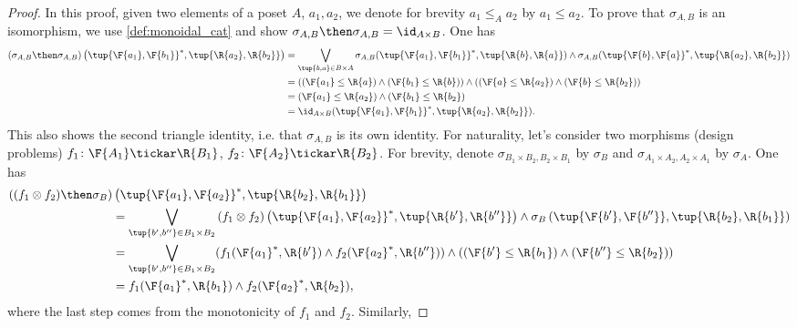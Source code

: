 \begin{proof}
In this proof, given two elements of a poset $A$, $a_1,a_2$, we denote for brevity $a_1 \leq_A a_2$ by $a_1 \leq a_2$.
To prove that $\sigma_{A,B}$ is an isomorphism, we use \cref{def:monoidal_cat} and show $\sigma_{A,B}\then \sigma_{A,B}=\id_{A\times B}$. One has
    \begin{equation}
        \begin{aligned}
           \left( \sigma_{A,B}\then \sigma_{A,B}\right) \left( \tup{\F{a_1},\F{b_1}}^*,\tup{\R{a_2},\R{b_2}}\right)&=\bigvee_{\tup{b,a}\in B\times A}\sigma_{A,B}(\tup{\F{a_1},\F{b_1}}^*,\tup{\R{b},\R{a}})\wedge \sigma_{A,B}(\tup{\F{b},\F{a}}^*,\tup{\R{a_2},\R{b_2}})\\
           &=\left( (\F{a_1}\leq \R{a}) \wedge (\F{b_1}\leq \R{b})\right)\wedge \left((\F{a}\leq \R{a_2}) \wedge (\F{b}\leq \R{b_2})\right)\\
           &=(\F{a_1}\leq \R{a_2})\wedge (\F{b_1}\leq \R{b_2})\\
           &=\id_{A\times B}(\tup{\F{a_1},\F{b_1}}^*,\tup{\R{a_2},\R{b_2}}).
        \end{aligned}
    \end{equation}
    This also shows the second triangle identity, i.e. that $\sigma_{A,B}$ is its own identity.
    For naturality, let's consider two morphisms (design problems) $f_1\colon \F{A_1}\tickar \R{B_1}$, $f_2\colon \F{A_2}\tickar \R{B_2}$. For brevity, denote $\sigma_{B_1\times B_2,B_2\times B_1}$ by $\sigma_B$ and $\sigma_{A_1\times A_2,A_2\times A_1}$ by $\sigma_A$. One has
    \begin{equation}
        \begin{aligned}
           \left((f_1\otimes f_2)\then \sigma_B \right)&\left( \tup{\F{a_1},\F{a_2}}^*,\tup{\R{b_2},\R{b_1}}\right)\\
           &=\bigvee_{\tup{b',b''}\in B_1\times B_2} \left(f_1\otimes f_2\right) \left( \tup{\F{a_1},\F{a_2}}^*,\tup{\R{b'},\R{b''}}\right)\wedge \sigma_B\left(\tup{\F{b'},\F{b''}},\tup{\R{b_2},\R{b_1}} \right)\\
           &=\bigvee_{\tup{b',b''}\in B_1\times B_2}(f_1(\F{a_1}^*,\R{b'})\wedge f_2(\F{a_2}^*,\R{b''}))\wedge (\left(\F{b'}\leq \R{b_1}\right) \wedge \left(\F{b''}\leq \R{b_2}\right))\\
           &= f_1(\F{a_1}^*,\R{b_1}) \wedge f_2(\F{a_2}^*,\R{b_2}),
        \end{aligned}
    \end{equation}
    where the last step comes from the monotonicity of $f_1$ and $f_2$. Similarly,

\end{proof}

